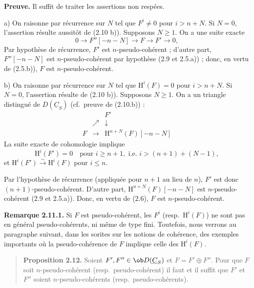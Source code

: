 \textbf{Preuve.} Il suffit de traiter les assertions non respées.

a) On raisonne par récurrence sur $N$ tel que $F^i \neq 0$ pour $i > n + N$. Si $N = 0$, l'assertion résulte aussitôt de (2.10 b)). Supposons $N \geqslant 1$. On a une suite exacte
\[
0 \longrightarrow F''[{-}n{-}N] \longrightarrow F \longrightarrow F' \longrightarrow 0,
\]
Par hypothèse de récurrence, $F'$ est $n$-pseudo-cohérent ; d'autre part, $F''[{-}n{-}N]$ est $n$-pseudo-cohérent par hypothèse (2.9 et 2.5.a)) ; donc, en vertu de (2.5.b)), $F$ est $n$-pseudo-cohérent.

b) On raisonne par récurrence sur $N$ tel que $\mathrm{H}^i(F) = 0$ pour $i > n + N$. Si $N = 0$, l'assertion résulte de (2.10 b)). Supposons $N \geqslant 1$. On a un triangle distingué de $D(\underline{C}_S)$ (cf.\ preuve de (2.10.b)) :
\[
\begin{array}{ccc}
& & F' \\
& \nearrow & \downarrow \\
F & \longrightarrow & \mathrm{H}^{n+N}(F)[{-}n{-}N]
\end{array}
\]
La suite exacte de cohomologie implique
\[
\mathrm{H}^i(F') = 0 \quad \text{pour } i \geqslant n+1, \text{ i.e.\ } i > (n+1) + (N-1),
\]
et $\mathrm{H}^i(F') \xrightarrow{\sim} \mathrm{H}^i(F)$ pour $i \leqslant n$.

Par l'hypothèse de récurrence (appliquée pour $n+1$ au lieu de $n$), $F'$ est donc $(n+1)$-pseudo-cohérent. D'autre part, $\mathrm{H}^{n+N}(F)[{-}n{-}N]$ est $n$-pseudo-cohérent (2.9 et 2.5.a)). Donc, en vertu de (2.6), $F$ est $n$-pseudo-cohérent.

\textbf{Remarque 2.11.1.} Si $F$ est pseudo-cohérent, les $F^i$ (resp.\ $\mathrm{H}^i(F)$) ne sont pas en général pseudo-cohérents, ni même de type fini. Toutefois, nous verrons au paragraphe suivant, dans les sorites sur les notions de cohérence, des exemples importants où la pseudo-cohérence de $F$ implique celle des $\mathrm{H}^i(F)$.

\begin{quote}
\textbf{Proposition 2.12.} Soient $F', F'' \in \ob D(\underline{C}_S)$ et $F = F' \oplus F''$. Pour que $F$ soit $n$-pseudo-cohérent (resp.\ pseudo-cohérent) il faut et il suffit que $F'$ et $F''$ soient $n$-pseudo-cohérents (resp.\ pseudo-cohérents).
\end{quote}


